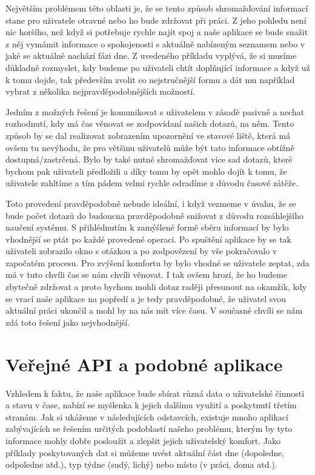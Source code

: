 \documentclass[thesis=M,czech]{FITthesis}[2012/06/26]
\begin{document}
Největším problémem této oblasti je, že se tento způsob shromažďování informací stane pro uživatele otravné nebo ho bude zdržovat při práci. Z jeho pohledu není nic horšího, než když si potřebuje rychle najít spoj a naše aplikace se bude snažit z něj vymámit informace o spokojenosti s aktuálně nabízeným seznamem nebo v jaké se aktuálně nachází fázi dne. Z uvedeného příkladu vyplývá, že si musíme důkladně rozmyslet, kdy budeme po uživateli chtít doplňující informace a když už k tomu dojde, tak především zvolit co nejstručnější formu a dát mu například vybrat z několika nejpravděpodobnějších možností.

Jedním z možných řešení je komunikovat s uživatelem v zásadě pasivně a nechat rozhodnutí, kdy má čas věnovat se zodpovídaní našich dotazů, na něm. Tento způsob by se dal realizovat zobrazením upozornění ve stavové liště, která má ovšem tu nevýhodu, že pro většinu uživatelů může být tato informace obtížně dostupná/zastrčená. Bylo by také nutné shromažďovat více sad dotazů, které bychom pak uživateli předložili a díky tomu by opět mohlo dojít k tomu, že uživatele zahltíme a tím pádem velmi rychle odradíme z důvodu časové zátěže.

Toto provedení pravděpodobně nebude ideální, i když vezmeme v úvahu, že se bude počet dotazů do budoucna pravděpodobně snižovat z důvodu rozsáhlejšího naučení systému. S přihlédnutím k zamýšlené formě sběru informací by bylo vhodnější se ptát po každé provedené operaci. Po spuštění aplikace by se tak uživateli zobrazilo okno s otázkou a po zodpovězení by vše pokračovalo v započatém procesu. Pro zvýšení komfortu by bylo vhodné se uživatele zeptat, zda má v tuto chvíli čas se nám chvíli věnovat. I tak ovšem hrozí, že ho budeme zbytečně zdržovat a proto bychom mohli dotaz raději přesunout na okamžik, kdy se vrací naše aplikace na popředí a je tedy pravděpodobné, že uživatel svou aktuální práci ukončil a mohl by na nás mít více času. V současné chvíli se nám zdá toto řešení jako nejvhodnější.

\section{Veřejné API a podobné aplikace}\label{api}
Vzhledem k faktu, že naše aplikace bude sbírat různá data o uživatelské činnosti a stavu v čase, nabízí se myšlenka k jejich dalšímu využití a poskytnutí třetím stranám. Jak si ukážeme v následujících odstavcích, existuje mnoho aplikací zabývajících se řešením určitých podoblastí našeho problému, kterým by tyto informace mohly dobře posloužit a zlepšit jejich uživatelský komfort. Jako příklady poskytovaných dat si můžeme uvést aktuální část dne (dopoledne, odpoledne atd.), typ týdne (sudý, lichý) nebo místo (v práci, doma atd.).
\end{document}

